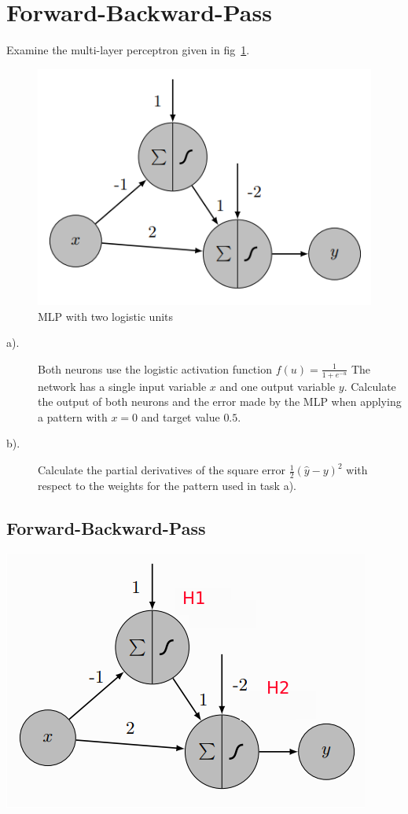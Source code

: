 \documentclass[12pt]{article}
\begin{document}
\newpage
\section{Forward-Backward-Pass}
Examine the multi-layer perceptron given in fig~\ref{fig:mlp}.

\begin{figure}[!htbp]
	\centering
	\includegraphics[width=.5\textwidth]{fig/2018-03-19-13-49-49.png}
	\caption{MLP with two logistic units} \label{fig:mlp}
\end{figure}

\begin{description}
	\item[a).]	Both neurons use the logistic activation function
	      $f(u)=\frac{1}{1+e^{-u}}$
	      The network has
	      a single input variable $x$ and one output variable $y$. Calculate the output of both
	      neurons and the error made by the MLP when applying a pattern with $x = 0$ and
	      target value $0.5$.
	\item[b).] Calculate the partial derivatives of the
	      square error $\frac{1}{2}(\hat{y} -y)^2$
	      with respect to the weights for the pattern used in task a).
\end{description}

\subsection{Forward-Backward-Pass}

\includegraphics[width=.4\textwidth]{fig/mod.png}
\end{document}
